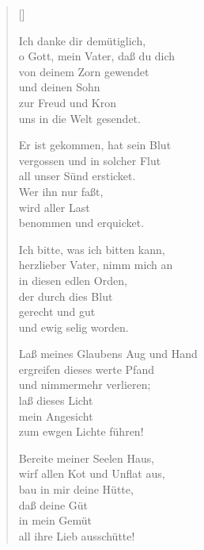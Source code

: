 \begin{multicols}{2}
\settowidth{\versewidth}{Ich bitte, was ich bitten kann,}
\begin{verse}[\versewidth]

 Ich danke dir demütiglich,\\
o Gott, mein Vater, daß du dich\\
von deinem Zorn gewendet\\
und deinen Sohn\\
zur Freud und Kron\\
uns in die Welt gesendet.

 Er ist gekommen, hat sein Blut\\
vergossen und in solcher Flut\\
all unser Sünd ersticket.\\
Wer ihn nur faßt,\\
wird aller Last\\
benommen und erquicket.

 Ich bitte, was ich bitten kann,\\
herzlieber Vater, nimm mich an\\
in diesen edlen Orden,\\
der durch dies Blut\\
gerecht und gut\\
und ewig selig worden.

 Laß meines Glaubens Aug und Hand\\
ergreifen dieses werte Pfand\\
und nimmermehr verlieren;\\
laß dieses Licht\\
mein Angesicht\\
zum ewgen Lichte führen!

 Bereite meiner Seelen Haus,\\
wirf allen Kot und Unflat aus,\\
bau in mir deine Hütte,\\
daß deine Güt\\
in mein Gemüt\\
all ihre Lieb ausschütte!


\end{verse}
\end{multicols}
